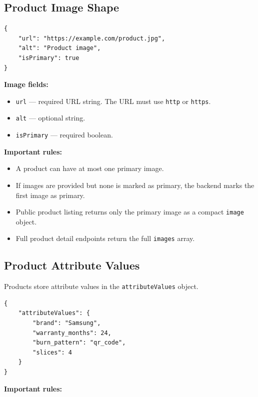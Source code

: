 \subsection{Product Image Shape}

\begin{verbatim}
{
    "url": "https://example.com/product.jpg",
    "alt": "Product image",
    "isPrimary": true
}
\end{verbatim}

\textbf{Image fields:}

\begin{itemize}
    \item \texttt{url} --- required URL string. The URL must use \texttt{http} or \texttt{https}.
    \item \texttt{alt} --- optional string.
    \item \texttt{isPrimary} --- required boolean.
\end{itemize}

\textbf{Important rules:}

\begin{itemize}
    \item A product can have at most one primary image.
    \item If images are provided but none is marked as primary, the backend marks the first image as primary.
    \item Public product listing returns only the primary image as a compact \texttt{image} object.
    \item Full product detail endpoints return the full \texttt{images} array.
\end{itemize}

\pagebreak
\subsection{Product Attribute Values}

Products store attribute values in the \texttt{attributeValues} object.

\begin{verbatim}
{
    "attributeValues": {
        "brand": "Samsung",
        "warranty_months": 24,
        "burn_pattern": "qr_code",
        "slices": 4
    }
}
\end{verbatim}

\textbf{Important rules:}

